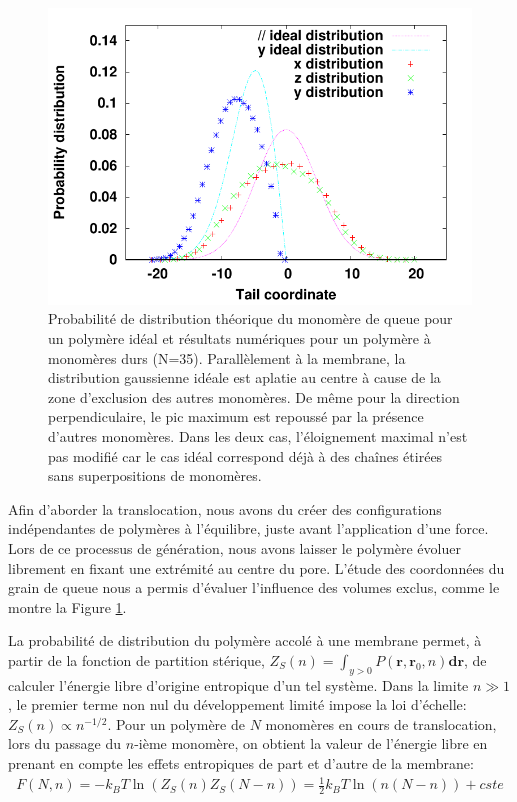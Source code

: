 \documentclass[a4paper,11pt]{article}
\begin{document}
\begin{figure}[H]
\begin{minipage}{0.45\linewidth}
\includegraphics[width=1.2\textwidth]{probdistribution.pdf}

\end{minipage}\hfill
\begin{minipage}{0.45\linewidth}
\caption{Probabilité de distribution théorique du monomère de queue pour un polymère idéal et résultats numériques pour un polymère à monomères durs (N=35). Parallèlement à la membrane, la distribution gaussienne idéale est aplatie au centre à cause de la zone d'exclusion des autres monomères. De même pour la direction perpendiculaire, le pic maximum est repoussé par la présence d'autres monomères. Dans les deux cas, l'éloignement maximal n'est pas modifié car le cas idéal correspond déjà à des chaînes étirées sans superpositions de monomères. }
\label{polagainstwall}
\end{minipage}
\end{figure}


Afin d'aborder la translocation, nous avons du créer des configurations indépendantes de polymères à l'équilibre, juste avant l'application d'une force. Lors de ce processus de génération, nous avons laisser le polymère évoluer librement en fixant une extrémité au centre du pore. L'étude des coordonnées du grain de queue nous a permis d'évaluer l'influence des volumes exclus, comme le montre la Figure \ref{polagainstwall}.


La probabilité de distribution du polymère accolé à une membrane permet, à partir de la fonction de partition stérique, $Z_S(n)= \int_{y>0} P(\textbf{r},\textbf{r}_0,n) \textbf{dr}$, de calculer l'énergie libre d'origine entropique d'un tel système. Dans la limite $n \gg 1$, le premier terme non nul du développement limité impose la loi d'échelle: $Z_S(n) \propto n^{-1/2}$. Pour un polymère de $N$ monomères en cours de translocation, lors du passage du $n$-ième monomère, on obtient la valeur de l'énergie libre en prenant en compte les effets entropiques de part et d'autre de la membrane:
\begin{eqnarray}
F(N,n)= -k_BT\ln\left(Z_S(n)Z_S(N-n)\right)= \frac{1}{2} k_BT \ln \left(n(N-n)\right) +cste
\end{eqnarray}
\end{document}
